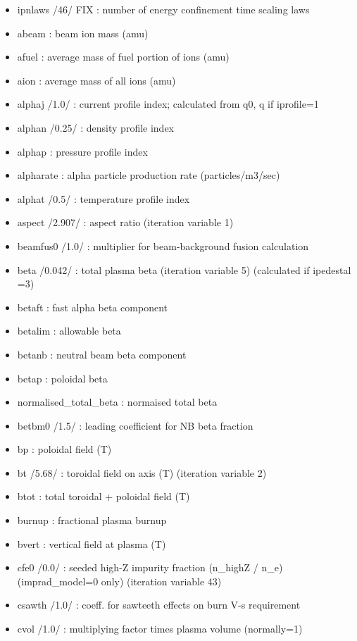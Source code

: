 \documentclass[]{article}
\providecommand{\tightlist}{%
  \setlength{\itemsep}{0pt}\setlength{\parskip}{0pt}}
\begin{document}
\begin{itemize}
\tightlist
\item
  ipnlaws /46/ FIX : number of energy confinement time scaling laws
\item
  abeam : beam ion mass (amu)
\item
  afuel : average mass of fuel portion of ions (amu)
\item
  aion : average mass of all ions (amu)
\item
  alphaj /1.0/ : current profile index; calculated from q0, q if
  iprofile=1
\item
  alphan /0.25/ : density profile index
\item
  alphap : pressure profile index
\item
  alpharate : alpha particle production rate (particles/m3/sec)
\item
  alphat /0.5/ : temperature profile index
\item
  aspect /2.907/ : aspect ratio (iteration variable 1)
\item
  beamfus0 /1.0/ : multiplier for beam-background fusion calculation
\item
  beta /0.042/ : total plasma beta (iteration variable 5) (calculated if
  ipedestal =3)
\item
  betaft : fast alpha beta component
\item
  betalim : allowable beta
\item
  betanb : neutral beam beta component
\item
  betap : poloidal beta
\item
  normalised\_total\_beta : normaised total beta
\item
  betbm0 /1.5/ : leading coefficient for NB beta fraction
\item
  bp : poloidal field (T)
\item
  bt /5.68/ : toroidal field on axis (T) (iteration variable 2)
\item
  btot : total toroidal + poloidal field (T)
\item
  burnup : fractional plasma burnup
\item
  bvert : vertical field at plasma (T)
\item
  cfe0 /0.0/ : seeded high-Z impurity fraction (n\_highZ / n\_e)
  (imprad\_model=0 only) (iteration variable 43)
\item
  csawth /1.0/ : coeff. for sawteeth effects on burn V-s requirement
\item
  cvol /1.0/ : multiplying factor times plasma volume (normally=1)

\end{itemize}
\end{document}
